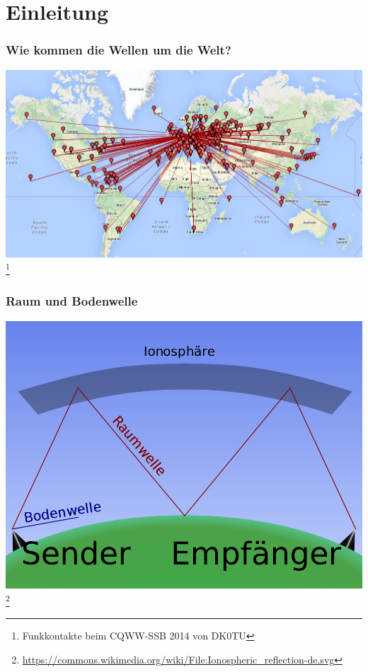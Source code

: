 

\subtitle{Technik 09: \\
           Die Wellenausbreitung \\[2em]}
\date{Stand 22.11.2014}



\section*{Einleitung}

\begin{frame}
    \frametitle{Wie kommen die Wellen um die Welt?}
    \begin{center}
        \includegraphics[width=1\textwidth]{e09/cqww-kontakte.png}
        \footnote{\tiny Funkkontakte beim CQWW-SSB 2014 von DK0TU}
    \end{center}
\end{frame}

\begin{frame}
    \frametitle{Raum und Bodenwelle}
	\begin{center}
        \includegraphics[width=.8\textwidth]{e09/Ionospheric_reflectionpng.png}
         \footnote{\tiny \url{https://commons.wikimedia.org/wiki/File:Ionospheric_reflection-de.svg}}
    \end{center}
\end{frame}


